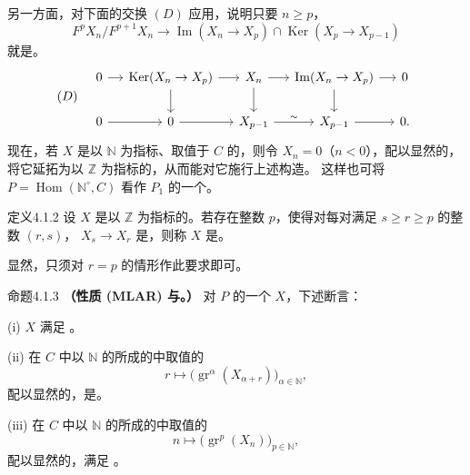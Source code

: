 另一方面，对下面的交换 $(D)$ 应用，说明只要 $n\geq p$，
\[
F^pX_n/F^{p+1}X_n\longrightarrow\operatorname{Im}(X_n\longrightarrow X_p)\cap\operatorname{Ker}(X_p\longrightarrow X_{p-1})
\]
就是。
\[
(D)\quad\begin{tikzcd}[column sep=small]
0\arrow[r]&\operatorname{Ker}(X_n\to X_p)\arrow[r]\arrow[d]&X_n\arrow[r]\arrow[d]&\operatorname{Im}(X_n\to X_p)\arrow[r]\arrow[d]&0\\
0\arrow[r]&0\arrow[r]&X_{p-1}\arrow[r,"\sim"]&X_{p-1}\arrow[r]&0.
\end{tikzcd}
\]
现在，若 $X$ 是以 $\mathbb N$ 为指标、取值于 $C$ 的，则令 $X_n=0$（$n<0$），配以显然的，将它延拓为以 $\mathbb Z$ 为指标的，从而能对它施行上述构造。
这样也可将 $P=\operatorname{Hom}(\mathbb N^\circ,C)$ 看作 $P_1$ 的一个。
\begin{SGAresult}{定义}{4.1.2}
设 $X$ 是以 $\mathbb Z$ 为指标的。若存在整数 $p$，使得对每对满足 $s\geq r\geq p$ 的整数 $(r,s)$， $X_s\to X_r$ 是，则称 $X$ 是。
\end{SGAresult}
显然，只须对 $r=p$ 的情形作此要求即可。
\begin{SGAresult}{命题}{4.1.3}
\textbf{（性质 (MLAR) 与。）} 对 $P$ 的一个 $X$，下述断言：

(i) $X$ 满足 。

(ii) 在 $C$ 中以 $\mathbb N$ 的所成的中取值的
\[
r\longmapsto\bigl(\operatorname{gr}^{\alpha}(X_{\alpha+r})\bigr)_{\alpha\in\mathbb N},
\]
配以显然的，是。

(iii) 在 $C$ 中以 $\mathbb N$ 的所成的中取值的
\[
n\longmapsto\bigl(\operatorname{gr}^p(X_n)\bigr)_{p\in\mathbb N},
\]
配以显然的，满足 。
\end{SGAresult}
